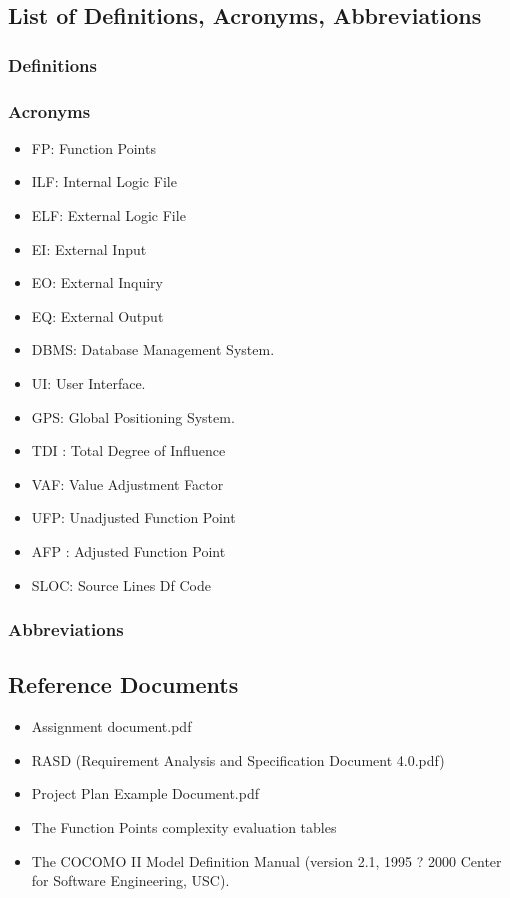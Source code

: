 \documentclass{article}
\begin{document}
\begin{flushleft}
\newpage
\subsection{List of Definitions, Acronyms, Abbreviations} %
\subsubsection{Definitions} %




\subsubsection{Acronyms} %
\begin{itemize}

\item{ FP: Function Points}
\item{ILF: Internal Logic File}
\item{ELF: External Logic File}
\item{ EI: External Input}
\item{ EO: External Inquiry}
\item{ EQ: External Output}
\item{DBMS: Database Management System.}
\item{UI: User Interface.}
\item{GPS: Global Positioning System.}
\item{TDI : Total Degree of Influence}
\item{VAF: Value Adjustment Factor}
\item {UFP: Unadjusted Function Point}
\item{AFP : Adjusted Function Point}
\item{SLOC: Source Lines Df Code}
\


\end{itemize}



\subsubsection{Abbreviations} %


\subsection{Reference Documents} %
\begin{itemize}
\item{Assignment document.pdf}
\item{RASD (Requirement Analysis and Specification Document 4.0.pdf)}
\item{Project Plan Example Document.pdf}
\item{The Function Points complexity evaluation tables}
\item The COCOMO II Model Definition Manual (version 2.1, 1995 ? 2000
Center for Software Engineering, USC).


\end{itemize}
\end{flushleft}
\end{document}
